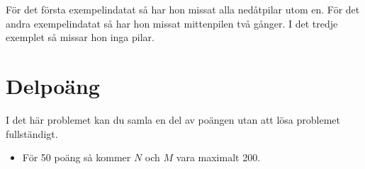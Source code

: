 För det första exempelindatat så har hon missat alla nedåtpilar utom
en. För det andra exempelindatat så har hon missat mittenpilen två
gånger. I det tredje exemplet så missar hon inga pilar.

\section*{Delpoäng}

I det här problemet kan du samla en del av poängen utan att
lösa problemet fullständigt.

\begin{itemize}
    \item För 50 poäng så kommer $N$ och $M$ vara maximalt 200.
\end{itemize}
